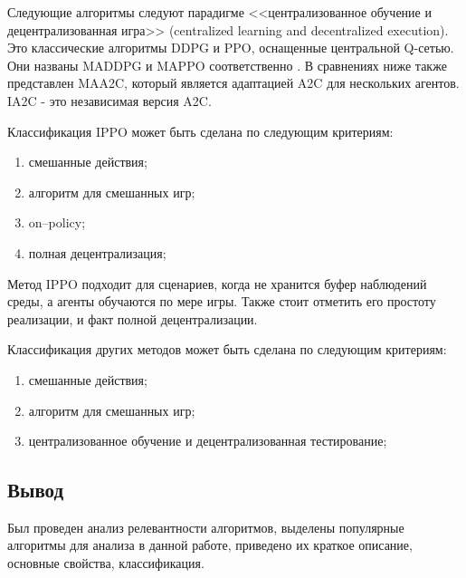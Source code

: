 Следующие алгоритмы следуют парадигме <<централизованное обучение и децентрализованная игра>> (centralized learning and decentralized execution).
Это классические алгоритмы DDPG и PPO, оснащенные центральной Q-сетью. Они названы MADDPG и MAPPO соответственно \cite{https://doi.org/10.48550/arxiv.1509.02971}.
В сравнениях ниже также представлен MAA2C, который является адаптацией A2C для нескольких агентов. IA2C - это независимая версия A2C.

Классификация IPPO может быть сделана по следующим критериям:
\begin{enumerate}[label={\arabic*)}]
	\item смешанные действия;
	\item алгоритм для смешанных игр;
	\item on--policy;
	\item полная децентрализация;
\end{enumerate}

Метод IPPO подходит для сценариев, когда не хранится буфер наблюдений среды, а агенты обучаются по мере игры.
Также стоит отметить его простоту реализации, и факт полной децентрализации.

Классификация других методов может быть сделана по следующим критериям:
\begin{enumerate}[label={\arabic*)}]
	\item смешанные действия;
	\item алгоритм для смешанных игр;
	\item централизованное обучение и децентрализованная тестирование;
\end{enumerate}

\subsection*{Вывод}

Был проведен анализ релевантности алгоритмов, выделены популярные алгоритмы для анализа в данной работе, приведено их краткое описание, основные свойства, классификация.
